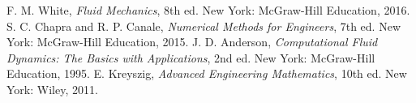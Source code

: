 \documentclass[conference]{IEEEtran}
\begin{document}
\begin{thebibliography}{00}
 F. M. White, \textit{Fluid Mechanics}, 8th ed. New York: McGraw-Hill Education, 2016.
 S. C. Chapra and R. P. Canale, \textit{Numerical Methods for Engineers}, 7th ed. New York: McGraw-Hill Education, 2015.
 J. D. Anderson, \textit{Computational Fluid Dynamics: The Basics with Applications}, 2nd ed. New York: McGraw-Hill Education, 1995.
 E. Kreyszig, \textit{Advanced Engineering Mathematics}, 10th ed. New York: Wiley, 2011.
\end{thebibliography}
\vspace{12pt}
\end{document}
